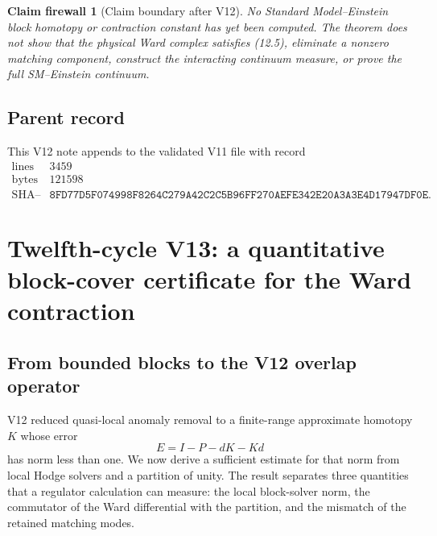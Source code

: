 \documentclass[11pt]{article}
\newtheorem{firewall}[theorem]{Claim firewall}
\theoremstyle{remark}
\begin{document}
\begin{firewall}[Claim boundary after V12]
\label{fire:v12v12-claim}
No Standard Model--Einstein block homotopy or contraction constant
has yet been computed.  The theorem does not show that the physical
Ward complex satisfies (12.5), eliminate a nonzero matching
component, construct the interacting continuum measure, or prove the
full SM--Einstein continuum.
\end{firewall}

\subsection{Parent record}

This V12 note appends to the validated V11 file with record
\[
\begin{array}{c|c}
\text{lines}&3459\\
\text{bytes}&121598\\
\text{SHA--256}&
\texttt{8FD77D5F074998F8264C279A42C2C5B96FF270AEFE342E20A3A3E4D17947DF0E}.
\end{array}
\]


\section{Twelfth-cycle V13: a quantitative block-cover certificate
for the Ward contraction}
\label{sec:v12v13}

\subsection{From bounded blocks to the V12 overlap operator}

V12 reduced quasi-local anomaly removal to a finite-range approximate
homotopy \(K\) whose error
\[
                         E=I-P-dK-Kd                       \tag{13.1}
\]
has norm less than one.  We now derive a sufficient estimate for
that norm from local Hodge solvers and a partition of unity.  The
result separates three quantities that a regulator calculation can
measure: the local block-solver norm, the commutator of the Ward
differential with the partition, and the mismatch of the retained
matching modes.
\end{document}
